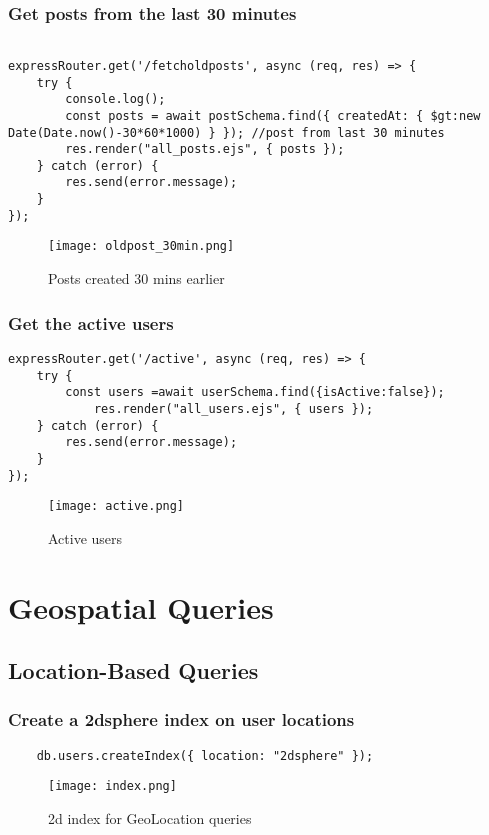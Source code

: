 \documentclass[12pt,a4paper]{article}
\begin{document}
\subsubsection{Get posts from the last 30 minutes}
\begin{lstlisting}

expressRouter.get('/fetcholdposts', async (req, res) => {
    try {
        console.log();
        const posts = await postSchema.find({ createdAt: { $gt:new Date(Date.now()-30*60*1000) } }); //post from last 30 minutes
        res.render("all_posts.ejs", { posts });
    } catch (error) {
        res.send(error.message);
    }
});

\end{lstlisting}
    \begin{figure}[H]
    \centering
    \texttt{[image: oldpost\_30min.png]}
    \caption{Posts created 30 mins earlier}
    \label{fig:sample}
\end{figure}


\subsubsection{Get the active users}
\begin{lstlisting}
expressRouter.get('/active', async (req, res) => {
    try {
        const users =await userSchema.find({isActive:false});
            res.render("all_users.ejs", { users });
    } catch (error) {
        res.send(error.message);
    }
});

\end{lstlisting}
    \begin{figure}[H]
    \centering
    \texttt{[image: active.png]}
    \caption{Active users}
    \label{fig:sample}
\end{figure}

\section{Geospatial Queries}
\subsection{Location-Based Queries}
\subsubsection{Create a 2dsphere index on user locations}
\begin{lstlisting}
    db.users.createIndex({ location: "2dsphere" });
\end{lstlisting}
\begin{figure}[H]
    \centering
    \texttt{[image: index.png]}
    \caption{2d index for GeoLocation queries}
    \label{fig:sample}
\end{figure}
\end{document}
